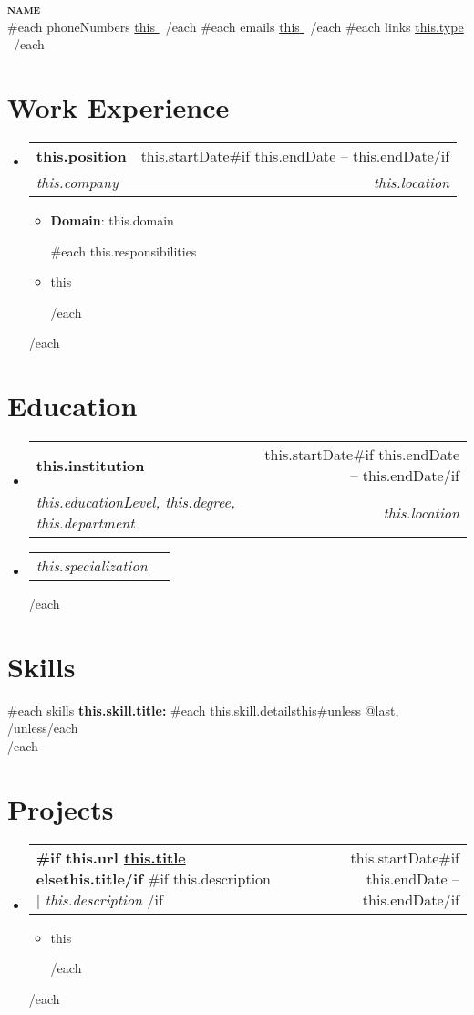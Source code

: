 \documentclass[letterpaper,11pt]{article}
\makeatletter
\newcommand{\resumeItem}[1]{
  \item\small{
    {#1 \vspace{-2pt}}
  }
}
\newcommand{\resumeSubheading}[4]{
  \vspace{-2pt}\item
    \begin{tabular*}{0.97\textwidth}[t]{l@{\extracolsep{\fill}}r}
      \textbf{#1} & #2 \\
      \textit{\small#3} & \textit{\small #4} \\
    \end{tabular*}\vspace{-7pt}
}
\newcommand{\resumeSubSubheading}[2]{
    \item
    \begin{tabular*}{0.97\textwidth}{l@{\extracolsep{\fill}}r}
      \textit{\small#1} & \textit{\small #2} \\
    \end{tabular*}\vspace{-7pt}
}
\newcommand{\resumeProjectHeading}[2]{
    \item
    \begin{tabular*}{0.97\textwidth}{l@{\extracolsep{\fill}}r}
      \small#1 & #2 \\
    \end{tabular*}\vspace{-7pt}
}
\newcommand{\resumeSubHeadingListStart}{\begin{itemize}[leftmargin=0.15in, label={}]}
\newcommand{\resumeSubHeadingListEnd}{\end{itemize}}
\newcommand{\resumeItemListStart}{\begin{itemize}}
\newcommand{\resumeItemListEnd}{\end{itemize}\vspace{-5pt}}
\makeatother
\begin{document}
\begin{center}
  \textbf{\Huge\scshape {{name}} } \\ \vspace{1pt}
  {{#each phoneNumbers}} \small{\underline{ {{this}} }}\, {{/each}}
  {{#each emails}} \small{\underline{ {{this}} }}\, {{/each}}
  {{#each links}} \small{\href{ {{this.url}} }{\underline{ {{this.type}} }}}\, {{/each}}
\end{center}

\section{Work Experience}
  \resumeSubHeadingListStart
  {{#each workExperiences}}
    \resumeSubheading
    { {{this.position}} }{ {{this.startDate}}{{#if this.endDate}} -- {{this.endDate}}{{/if}} }
        { {{this.company}} }{ {{this.location}} }
        \resumeItemListStart
          \resumeItem{\textbf{Domain}: {{this.domain}} }
          {{#each this.responsibilities}}
          \resumeItem{ {{this}} }
          {{/each}}
        \resumeItemListEnd
  {{/each}}
  \resumeSubHeadingListEnd

\section{Education}
  \resumeSubHeadingListStart
  {{#each educations}}
    \resumeSubheading
    { {{this.institution}} } { {{this.startDate}}{{#if this.endDate}} -- {{this.endDate}}{{/if}} }
        { {{this.educationLevel}}, {{this.degree}}, {{this.department}} }{ {{this.location}} }
        \resumeSubSubheading
          { {{this.specialization}} }
          {}
  {{/each}}
  \resumeSubHeadingListEnd

\section{Skills}
 \begin{itemize}[leftmargin=0.15in, label={}]
    \small{\item{
      {{#each skills}}
        \textbf{ {{this.skill.title}}: }{ {{#each this.skill.details}}{{this}}{{#unless @last}}, {{/unless}}{{/each}} } \\
      {{/each}}
    }}
 \end{itemize}

\section{Projects}
    \resumeSubHeadingListStart
    {{#each projects}}
      \resumeProjectHeading
        { \textbf{ {{#if this.url}} \href{ {{this.url}} }{ {{this.title}} } {{else}}{{this.title}}{{/if}} }{{#if this.description}}$|$\emph{ {{this.description}} } {{/if}} }{ {{this.startDate}}{{#if this.endDate}} -- {{this.endDate}}{{/if}} }
          \resumeItemListStart
            {{#each this.responsibilities}}
              \resumeItem{ {{this}} }
            {{/each}}
          \resumeItemListEnd
    {{/each}}
    \resumeSubHeadingListEnd
\end{document}
